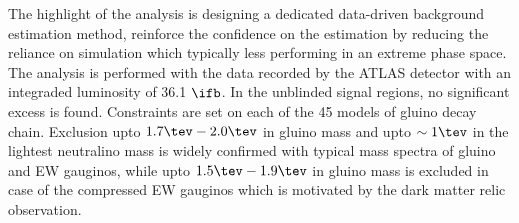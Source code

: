 The highlight of the analysis is designing a dedicated data-driven background estimation method, reinforce the confidence on the estimation by reducing the reliance on simulation which typically less performing in an extreme phase space. \\

The analysis is performed with the data recorded by the ATLAS detector with an integraded luminosity of 36.1 $\ifb$. 
In the unblinded signal regions, no significant excess is found.
Constraints are set on each of the 45 models of gluino decay chain.
Exclusion upto $1.7\tev - 2.0 \tev$ in gluino mass and upto $\sim 1\tev$ in the lightest neutralino mass is widely confirmed 
with typical mass spectra of gluino and EW gauginos, while upto $1.5\tev - 1.9 \tev$ in gluino mass is excluded in case of the compressed EW gauginos which is motivated by the dark matter relic observation.

